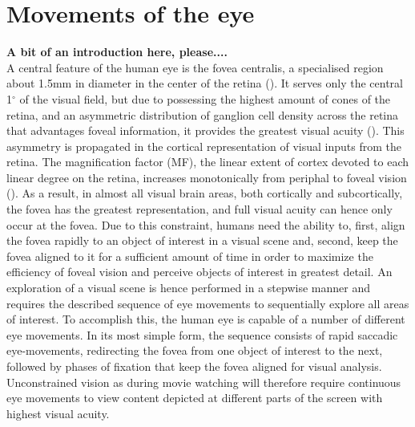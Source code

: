 \documentclass[a4paper, 12pt]{scrreprt}
\begin{document}
\section{Movements of the eye}\label{section:eyemoves}

\textbf{A bit of an introduction here, please....}\\ A central feature of the human eye is the fovea centralis, a specialised region about 1.5mm in diameter in the center of the retina (\cite{benninghof2004anat}). It serves only the central 1$^\circ$ of the visual field, but due to possessing the highest amount of cones of the retina, and an asymmetric distribution of ganglion cell density across the retina that advantages foveal information, it provides the greatest visual acuity (\cite{perry1986ganglion}). This asymmetry is propagated in the cortical representation of visual inputs from the retina. The magnification factor (MF), the linear extent of cortex devoted to each linear degree on the retina, increases monotonically from periphal to foveal vision (\cite{daniel1961representation}). As a result, in almost all visual brain areas, both cortically and subcortically, the fovea has the greatest representation, and full visual acuity can hence only occur at the fovea. Due to this constraint, humans need the ability to, first, align the fovea rapidly to an object of interest in a visual scene and, second, keep the fovea aligned to it for a sufficient amount of time in order to maximize the efficiency of foveal vision and perceive objects of interest in greatest detail. An exploration of a visual scene is hence performed in a stepwise manner and requires the described sequence of eye movements to sequentially explore all areas of interest. To accomplish this, the human eye is capable of a number of different eye movements. In its most simple form, the sequence consists of rapid saccadic eye-movements, redirecting the fovea from one object of interest to the next, followed by phases of fixation that keep the fovea aligned for visual analysis. Unconstrained vision as during movie watching will therefore require continuous eye movements to view content depicted at different parts of the screen with highest visual acuity.\newline
\end{document}
